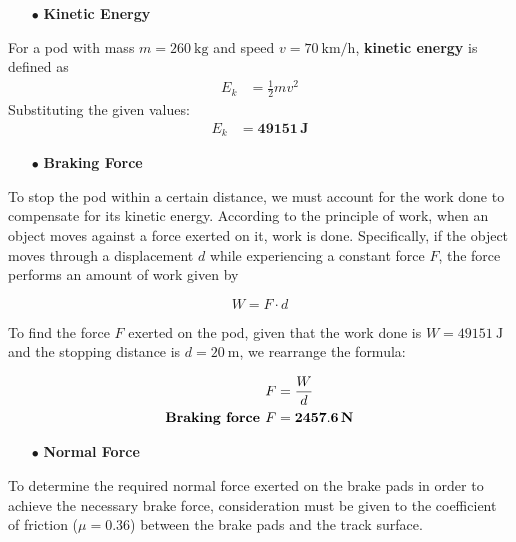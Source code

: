 \begin{itemize}[leftmargin=*]
    \item[$\bullet$] \textbf{Kinetic Energy}
\end{itemize}

\noindent
For a pod with mass \(m=260\ \text{kg}\) and speed \(v=70\ \text{km/h}\), \textbf{kinetic energy} is defined as
\begin{align*}
    E_k &= \frac{1}{2} mv^2
\end{align*}
Substituting the given values:
\begin{align}
    E_k &= \mathbf{49151} \, \textbf{J}
\end{align}













\begin{itemize}[leftmargin=*]
  \item[\hspace{-1cm}$\bullet$] \textbf{Braking Force}
\end{itemize}
\noindent
To stop the pod within a certain distance, we must account for the work done to compensate for its kinetic energy. According to the principle of work, when an object moves against a force exerted on it, work is done. Specifically, if the object moves through a displacement $d$ while experiencing a constant force $F$, the force performs an amount of work given by




\[
W = F \cdot d
\]

To find the force \( F \) exerted on the pod, given that the work done is \( W = 49151~\text{J} \) and the stopping distance is \( d = 20~\text{m} \), we rearrange the formula:

\begin{align}
F &= \frac{W}{d} \notag \\
\textbf{Braking force } F &= \mathbf{2457.6}\, \textbf{N} 
\end{align}







\begin{itemize}[leftmargin=*]
    \item[$\bullet$] \textbf{Normal Force}
\end{itemize}
\noindent
To determine the required normal force exerted on the brake pads in order to achieve the necessary brake force, consideration must be given to the coefficient of friction ($\mu = 0.36$) between the brake pads and the track surface.






